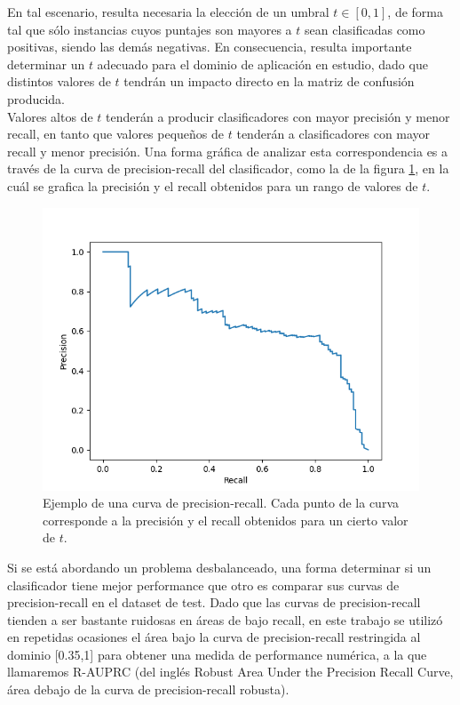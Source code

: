 En tal escenario, resulta necesaria la elección de un umbral $t \in [0,1]$, de forma tal que sólo instancias cuyos puntajes son mayores a $t$ sean clasificadas como positivas, siendo las demás negativas. En consecuencia, resulta importante determinar un $t$ adecuado para el dominio de aplicación en estudio, dado que distintos valores de $t$ tendrán un impacto directo en la matriz de confusión producida. \\

Valores altos de $t$ tenderán a producir clasificadores con mayor precisión y menor recall, en tanto que valores pequeños de $t$ tenderán a clasificadores con mayor recall y menor precisión. Una forma gráfica de analizar esta correspondencia es a través de la curva de precision-recall del clasificador, como la de la figura \ref{fig:prc}, en la cuál se grafica la precisión y el recall obtenidos para un rango de valores de $t$. \\

\begin{figure}[h]
\begin{center}
\includegraphics[width=.6\textwidth]{Kap1/PRc.png}
\end{center}
\caption[short]{Ejemplo de una curva de precision-recall. Cada punto de la curva corresponde a la precisión y el recall obtenidos para un cierto valor de $t$. }
\label{fig:prc}
\end{figure}

Si se está abordando un problema desbalanceado, una forma determinar si un clasificador tiene mejor performance que otro es comparar sus curvas de precision-recall en el dataset de test. Dado que las curvas de precision-recall tienden a ser bastante ruidosas en áreas de bajo recall, en este trabajo se utilizó en repetidas ocasiones el área bajo la curva de precision-recall restringida al dominio [0.35,1] para obtener una medida de performance numérica, a la que llamaremos R-AUPRC (del inglés Robust Area Under the Precision Recall Curve, área debajo de la curva de precision-recall robusta).\\


